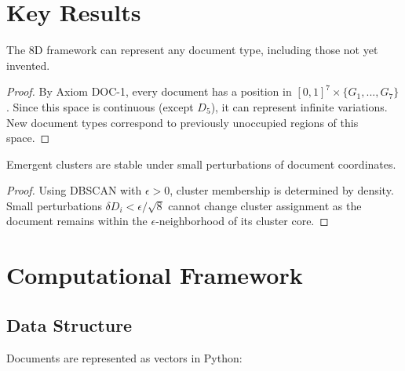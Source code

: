\section{Key Results}
\label{sec:doctype-results}

\begin{proposition}[Universality]
The 8D framework can represent any document type, including those not yet invented.
\end{proposition}

\begin{proof}
By Axiom DOC-1, every document has a position in $[0,1]^7 \times \{G_1,...,G_7\}$.
Since this space is continuous (except $D_5$), it can represent infinite variations.
New document types correspond to previously unoccupied regions of this space.
\end{proof}

\begin{proposition}
Emergent clusters are stable under small perturbations of document coordinates.
\end{proposition}

\begin{proof}
Using DBSCAN with $\epsilon > 0$, cluster membership is determined by density.
Small perturbations $\delta D_i < \epsilon/\sqrt{8}$ cannot change cluster assignment
as the document remains within the $\epsilon$-neighborhood of its cluster core.
\end{proof}


\section{Computational Framework}
\label{sec:doctype-computation}

\subsection{Data Structure}

Documents are represented as vectors in Python:

